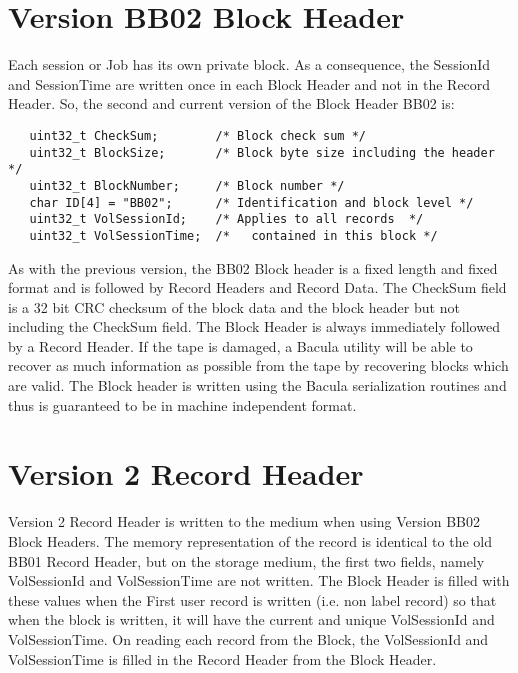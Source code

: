 \section{Version BB02 Block Header}

Each session or Job has its own private block. As a consequence, the SessionId
and SessionTime are written once in each Block Header and not in the Record
Header. So, the second and current version of the Block Header BB02 is: 

\footnotesize
\begin{verbatim}
   uint32_t CheckSum;        /* Block check sum */
   uint32_t BlockSize;       /* Block byte size including the header */
   uint32_t BlockNumber;     /* Block number */
   char ID[4] = "BB02";      /* Identification and block level */
   uint32_t VolSessionId;    /* Applies to all records  */
   uint32_t VolSessionTime;  /*   contained in this block */
\end{verbatim}
\normalsize

As with the previous version, the BB02 Block header is a fixed length and
fixed format and is followed by Record Headers and Record Data. The CheckSum
field is a 32 bit CRC checksum of the block data and the block header but not
including the CheckSum field. The Block Header is always immediately followed
by a Record Header. If the tape is damaged, a Bacula utility will be able to
recover as much information as possible from the tape by recovering blocks
which are valid. The Block header is written using the Bacula serialization
routines and thus is guaranteed to be in machine independent format. 

\section{Version 2 Record Header}

Version 2 Record Header is written to the medium when using Version BB02 Block
Headers. The memory representation of the record is identical to the old BB01
Record Header, but on the storage medium, the first two fields, namely
VolSessionId and VolSessionTime are not written. The Block Header is filled
with these values when the First user record is written (i.e. non label
record) so that when the block is written, it will have the current and unique
VolSessionId and VolSessionTime. On reading each record from the Block, the
VolSessionId and VolSessionTime is filled in the Record Header from the Block
Header. 

